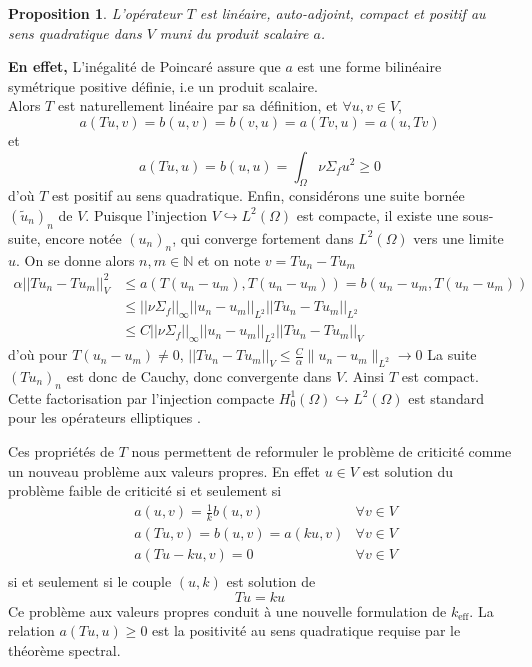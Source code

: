 \documentclass{article}
\newtheorem{proposition}[theorem]{Proposition}
\newcommand{\keff}{k_{\mathrm{eff}}}
\begin{document}
\begin{proposition}
    L'opérateur $T$ est linéaire, auto-adjoint, compact et positif au sens quadratique dans $V$ muni du produit scalaire $a$.
\end{proposition}
\textbf{En effet,} L'inégalité de Poincaré assure que $a$ est une forme bilinéaire symétrique positive définie, i.e un produit scalaire. \\
Alors $T$ est naturellement linéaire par sa définition, et $\forall u,v \in V$,
\[
a(Tu,v) = b(u,v) = b(v,u) = a(Tv,u) = a(u,Tv)
\]
et
\[
a(Tu,u) = b(u,u) = \int_{\Omega} \nu\Sigma_fu^2 \ge 0 
\]
d'où $T$ est positif au sens quadratique. Enfin, considérons une suite bornée $(\tilde{u}_n)_n$ de $V$. Puisque l'injection $V\hookrightarrow L^2(\Omega)$ est compacte, il existe une sous-suite, encore notée $(u_n)_n$, qui converge fortement dans $L^2(\Omega)$ vers une limite $u$.
On se donne alors $n,m \in \mathbb{N}$ et on note $v=Tu_n-Tu_m$
\begin{align*}
    \alpha||Tu_n-Tu_m||^2_V &\le a(T(u_n-u_m),T(u_n-u_m)) = b(u_n-u_m,T(u_n-u_m))\\
    &\le ||\nu\Sigma_f||_\infty||u_n-u_m||_{L^2}||Tu_n-Tu_m||_{L^2}\\
    &\le C||\nu\Sigma_f||_\infty||u_n-u_m||_{L^2}||Tu_n-Tu_m||_V
\end{align*}
d'où pour $T(u_n - u_m) \neq 0$, $||Tu_n-Tu_m||_V \le \frac{C}{\alpha}\|u_n-u_m\|_{L^2} \to 0$
La suite $(Tu_n)_n$ est donc de Cauchy, donc convergente dans $V$. Ainsi $T$ est compact. Cette factorisation par l'injection compacte $H_0^1(\Omega)\hookrightarrow L^2(\Omega)$ est standard pour les opérateurs elliptiques \cite{Brezis2011,Evans2010}.

\bigskip
Ces propriétés de $T$ nous permettent de reformuler le problème de criticité comme un nouveau problème aux valeurs propres.
En effet $u\in V$ est solution du problème faible de criticité si et seulement si 
\begin{align*}
    &a(u,v) = \frac1kb(u,v) \qquad  &\forall v\in V\\
    &a(Tu,v) = b(u,v) = a(ku,v) &\forall v\in V\\
    &a(Tu-ku,v) = 0 &\forall v\in V\\
\end{align*}
si et seulement si le couple $(u,k)$ est solution de 
\begin{equation}
    Tu = ku
\end{equation}
Ce problème aux valeurs propres conduit à une nouvelle formulation de $\keff$. La relation $a(Tu,u)\geq0$ est la positivité au sens quadratique requise par le théorème spectral.
\end{document}
